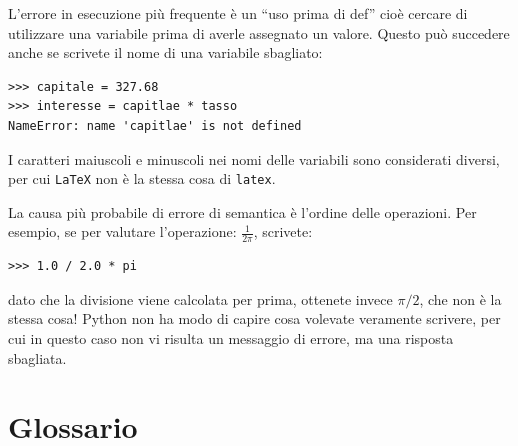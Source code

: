 \documentclass[10pt]{book}
\begin{document}
L'errore in esecuzione più frequente è un ``uso prima di def'' cioè cercare di utilizzare una variabile prima di averle assegnato un valore. Questo può succedere anche se scrivete il nome di una variabile sbagliato: 

\begin{verbatim}
>>> capitale = 327.68
>>> interesse = capitlae * tasso
NameError: name 'capitlae' is not defined
\end{verbatim}
%
I caratteri maiuscoli e minuscoli nei nomi delle variabili sono considerati diversi, per cui {\tt LaTeX} non è la stessa cosa di {\tt latex}.

La causa più probabile di errore di semantica è l'ordine delle operazioni. Per esempio, se per valutare l'operazione:
 $\frac{1}{2 \pi}$,
scrivete:

\begin{verbatim}
>>> 1.0 / 2.0 * pi
\end{verbatim}
%
dato che la divisione viene calcolata per prima, ottenete invece $\pi / 2$, che non è la stessa cosa! Python non ha modo di capire cosa volevate veramente scrivere, per cui in questo caso non vi risulta un messaggio di errore, ma una risposta sbagliata.


\section{Glossario}
\end{document}
